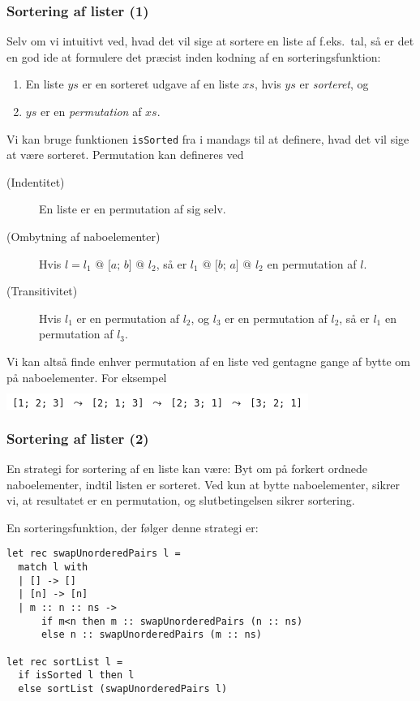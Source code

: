 \documentclass{beamer}
\begin{document}
\begin{frame}
\frametitle{Sortering af lister (1)}

Selv om vi intuitivt ved, hvad det vil sige at sortere en liste af
f.eks.\ tal, så er det en god ide at formulere det præcist inden
kodning af en sorteringsfunktion:

\begin{enumerate}[~1.]
\item En liste $ys$ er en sorteret udgave af en liste $xs$, hvis $ys$
  er \emph{sorteret}, og\\
\item $ys$ er en \emph{permutation} af $xs$.
\end{enumerate}

Vi kan bruge funktionen \texttt{isSorted} fra i mandags til at definere,
hvad det vil sige at være sorteret.  Permutation kan defineres ved


\begin{description}
\item[(Indentitet)] En liste er en permutation af sig selv.
\item[(Ombytning af naboelementer)] Hvis $l = l_1 \texttt{ @ [$a$; $b$] @ } l_2$, så er $l_1
  \texttt{ @ [$b$; $a$] @ } l_2$ en permutation af $l$.
\item[(Transitivitet)] Hvis $l_1$ er en permutation af $l_2$, og $l_3$ er en
  permutation af $l_2$, så er $l_1$ en permutation af $l_3$.
\end{description}

Vi kan altså finde enhver permutation af en liste ved gentagne gange
af bytte om på naboelementer.  For eksempel

\texttt{\colorbox{white}{
[1; 2; 3] $\leadsto$ [2; 1; 3] $\leadsto$ [2; 3; 1] $\leadsto$ [3; 2; 1]
}}

\end{frame}

\begin{frame}[fragile=singleslide]
\frametitle{Sortering af lister (2)}

En strategi for sortering af en liste kan være: Byt om på forkert
ordnede naboelementer, indtil listen er sorteret.  Ved kun at bytte
naboelementer, sikrer vi, at resultatet er en permutation, og
slutbetingelsen sikrer sortering.

En sorteringsfunktion, der følger denne strategi er:

\begin{verbatim}
let rec swapUnorderedPairs l =
  match l with
  | [] -> []
  | [n] -> [n]
  | m :: n :: ns ->
      if m<n then m :: swapUnorderedPairs (n :: ns)
      else n :: swapUnorderedPairs (m :: ns)

let rec sortList l =
  if isSorted l then l
  else sortList (swapUnorderedPairs l)
\end{verbatim}

\end{frame}
\end{document}
